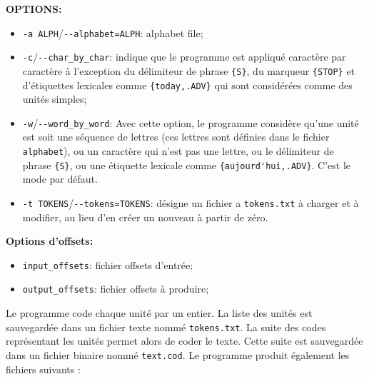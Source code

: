 \bigskip
\noindent \textbf{OPTIONS:}
\begin{itemize}
  \item \verb+-a ALPH+/\verb+--alphabet=ALPH+: alphabet file;
  
  \item \verb+-c+/\verb+--char_by_char+: indique que le  programme est appliqué caractère
  	  par caractère à l'exception du délimiteur de phrase \verb+{S}+,
  	  du marqueur \verb+{STOP}+ et d'étiquettes lexicales comme \verb+{today,.ADV}+ qui sont considérées comme des unités simples;

 \item \verb+-w+/\verb+--word_by_word+: Avec cette option, le programme 
 	 considère qu'une unité est soit une séquence de lettres (ces lettres sont définies dans le fichier \verb+alphabet+), ou un caractère qui n'est pas une lettre, ou le délimiteur de phrase \verb+{S}+, ou une étiquette lexicale comme
 	 \verb+{aujourd'hui,.ADV}+. 
    C'est le mode par défaut.

\item \verb+-t TOKENS+/\verb+--tokens=TOKENS+: désigne un fichier a \verb+tokens.txt+
 à charger et à modifier, au lieu d'en créer un nouveau à partir de zéro.
\end{itemize}
\bigskip
\noindent \textbf{Options d'offsets:}
\begin{itemize}
\item \verb+input_offsets+: fichier offsets d'entrée;
\item \verb+output_offsets+: fichier offsets à  produire;
\end{itemize}


\bigskip
\noindent Le programme code chaque unité par un entier. La liste des unités est sauvegardée dans
un fichier texte nommé \verb+tokens.txt+. La suite des codes représentant les unités permet alors
de coder le texte. Cette suite est sauvegardée dans un fichier binaire nommé \verb+text.cod+.  
Le programme produit également les fichiers suivants :



